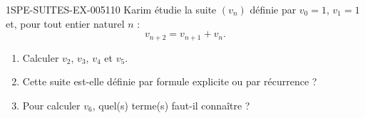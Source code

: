\begin{exercice}{1SPE-SUITES-EX-005}{1}{10}
Karim étudie la suite $(v_n)$ définie par $v_0 = 1$, $v_1 = 1$ et, pour tout entier naturel $n$ :
\[
  v_{n+2} = v_{n+1} + v_n.
\]
\begin{enumerate}
  \item Calculer $v_2$, $v_3$, $v_4$ et $v_5$.
  \item Cette suite est-elle définie par formule explicite ou par récurrence ?
  \item Pour calculer $v_6$, quel(s) terme(s) faut-il connaître ?
\end{enumerate}
\end{exercice}
